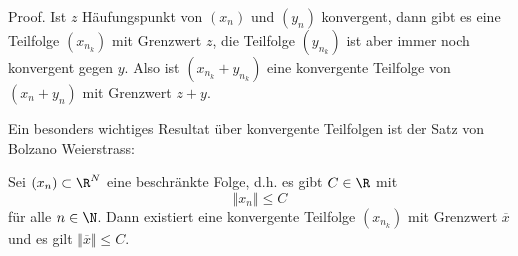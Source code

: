 \documentclass[letterpaper,10pt,english]{jupyterBook}
\begin{document}
\begin{emphBox}{}{}
Proof.  Ist \(z\) Häufungspunkt von \((x_n)\) und \((y_n)\) konvergent, dann gibt es eine Teilfolge \((x_{n_k})\) mit Grenzwert \(z\), die Teilfolge \((y_{n_k})\) ist aber immer noch konvergent gegen \(y\). Also ist \((x_{n_k}+y_{n_k})\) eine konvergente Teilfolge von \((x_n+y_n)\) mit Grenzwert \(z+y\).
\end{emphBox}

Ein besonders wichtiges Resultat über konvergente Teilfolgen ist der Satz von Bolzano Weierstrass:
\label{metrik/teilfolgen:theorem-5}
\begin{theorem}{}{}



Sei \((x_n) \subset \R^N\) eine beschränkte Folge, d.h. es gibt \(C \in \R\) mit
\begin{equation*}
 \Vert x_n \Vert \leq C
\end{equation*}
für alle \(n \in \N\). Dann existiert eine konvergente Teilfolge \((x_{n_k})\) mit Grenzwert \(\overline{x}\) und es gilt \(\Vert \overline{x} \Vert \leq C\).
\end{theorem}
\end{document}

